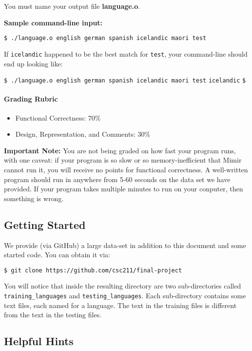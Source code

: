 \documentclass[]{article}
\providecommand{\tightlist}{%
  \setlength{\itemsep}{0pt}\setlength{\parskip}{0pt}}
\let\oldparagraph\paragraph
\renewcommand{\paragraph}[1]{\oldparagraph{#1}\mbox{}}
\begin{document}
You must name your output file \textbf{language.o}.

\textbf{Sample command-line input:}

\texttt{\$ ./language.o english german spanish icelandic maori test}

If \texttt{icelandic} happened to be the best match for \texttt{test},
your command-line should end up looking like:

\texttt{\$ ./language.o english german spanish icelandic maori test}
\texttt{icelandic}
\texttt{\$ }

\paragraph{Grading Rubric}\label{grading-rubric-1}

\begin{itemize}
\tightlist
\item
  Functional Correctness: 70\%
\item
  Design, Representation, and Comments: 30\%
\end{itemize}

\textbf{Important Note:} You are not being graded on how fast your
program runs, with one caveat: if your program is so slow or so
memory-inefficient that Mimir cannot run it, you will receive no points
for functional correctness. A well-written program should run in
anywhere from 5-60 seconds on the data set we have provided. If your
program takes multiple minutes to run on your conputer, then something
is wrong.

\subsection{Getting Started}\label{getting-started}

We provide (via GitHub) a large data-set in addition to this document
and some started code. You can obtain it via:

\texttt{\$ git clone https://github.com/csc211/final-project}

You will notice that inside the resulting directory are two
sub-directories called \texttt{training\_languages} and
\texttt{testing\_languages}. Each sub-directory contains some text
files, each named for a language. The text in the training files is
different from the text in the testing files.

\subsection{Helpful Hints}\label{helpful-hints}
\end{document}
